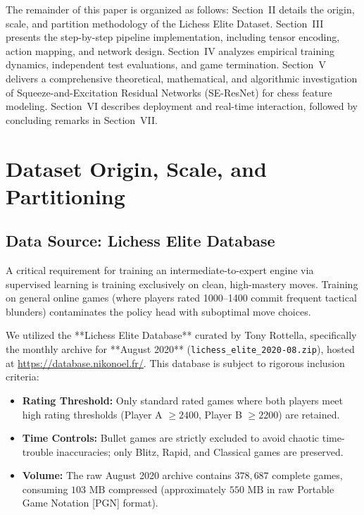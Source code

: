 \documentclass[10pt,journal,compsoc]{IEEEtran}
\begin{document}
The remainder of this paper is organized as follows: Section~II details the origin, scale, and partition methodology of the Lichess Elite Dataset. Section~III presents the step-by-step pipeline implementation, including tensor encoding, action mapping, and network design. Section~IV analyzes empirical training dynamics, independent test evaluations, and game termination. Section~V delivers a comprehensive theoretical, mathematical, and algorithmic investigation of Squeeze-and-Excitation Residual Networks (SE-ResNet) for chess feature modeling. Section~VI describes deployment and real-time interaction, followed by concluding remarks in Section~VII.

\section{Dataset Origin, Scale, and Partitioning}
\label{sec:dataset}

\subsection{Data Source: Lichess Elite Database}
A critical requirement for training an intermediate-to-expert engine via supervised learning is training exclusively on clean, high-mastery moves. Training on general online games (where players rated 1000--1400 commit frequent tactical blunders) contaminates the policy head with suboptimal move choices.

We utilized the **Lichess Elite Database** curated by Tony Rottella, specifically the monthly archive for **August 2020** (\texttt{lichess\_elite\_2020-08.zip}), hosted at \url{https://database.nikonoel.fr/}. This database is subject to rigorous inclusion criteria:
\begin{itemize}
    \item \textbf{Rating Threshold:} Only standard rated games where both players meet high rating thresholds (Player A $\ge 2400$, Player B $\ge 2200$) are retained.
    \item \textbf{Time Controls:} Bullet games are strictly excluded to avoid chaotic time-trouble inaccuracies; only Blitz, Rapid, and Classical games are preserved.
    \item \textbf{Volume:} The raw August 2020 archive contains $378,687$ complete games, consuming $103\text{ MB}$ compressed (approximately $550\text{ MB}$ in raw Portable Game Notation [PGN] format).
\end{itemize}
\end{document}
